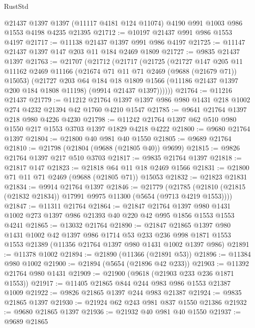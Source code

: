 \begin{lexlean}{RustStd}
\begin{coremodule}
    @21437
    @1397
    @1397
    (@11117 @4181 @124 @11074)
    @4190
    @991
    @1003
    @986
    @1553
    @4198
    @4235
    @21395
@21712 := @10197 @21437 @991 @986 @1553 @4197
@21717 := @11138 @21437 @1397 @991 @986 @4197
@21725 := @11147 @21437 @1397 @147 @203 @11 @184 @2469 @1809
@21727 := @9835 @21437 @1397
@21763 := @21707
    (@21712
      (@21717
        (@21725
          (@21727
            @147
            @205
            @11
            @11162
            @2469
            @11166
            (@21674 @71 @11 @71 @2469 (@9688 (@21679 @71)) @15053)
            (@21727
              @203
              @64
              @184
              @18
              @1809
              @1566
              (@11186 @21437 @1397 @200 @184 @1808 @11198)
              (@9914 @21437 @1397))))))
@21764 := @11216 @21437
@21779 := @11212
    @21764
    @1397
    @1397
    @986
    @980
    @1431
    @218
    @1002
    @274
    @4232
    @21394
    @42
    @1760
    @4210
    @1547
@21785 := @9641 @21764 @1397 @218 @980 @4226 @4230
@21798 := @11242 @21764 @1397 @62 @510 @980 @1550 @217 @1553 @3703 @1397 @1829 @4218 @4222
@21800 := @9680 @21764 @1397
@21804 := @21800 @40 @981 @40 @1550
@21805 := @9689 @21764
@21810 := @21798 (@21804 (@9688 (@21805 @40)) @9699)
@21815 := @9826 @21764 @1397 @217 @510 @3703
@21817 := @9835 @21764 @1397
@21818 := @21817 @147
@21823 := @21818 @64 @11 @18 @2469 @1566
@21831 := @21800 @71 @11 @71 @2469 (@9688 (@21805 @71)) @15053
@21832 := @21823 @21831
@21834 := @9914 @21764 @1397
@21846 := @21779
    (@21785 (@21810 (@21815 (@21832 @21834)) @17991 @9975 @11300 (@5654 (@9713 @4219 @1553))))
@21847 := @11311 @21764
@21864 := @21847
    @21764
    @1397
    @980
    @1431
    @1002
    @273
    @1397
    @986
    @21393
    @40
    @220
    @42
    @995
    @1856
    @1553
    @1553
    @4241
@21865 := @13032 @21764
@21890 := @21847
    @21865
    @1397
    @980
    @1431
    @1002
    @42
    @1397
    @986
    @1714
    @53
    @233
    @236
    @998
    @1871
    @1553
    @1553
    @21389
    (@11356 @21764 @1397 @980 @1431 @1002 @1397 @986)
@21891 := @11378 @1002
@21894 := @21890 (@11366 (@21891 @53))
@21896 := @11384 @980 @1002
@21900 := @21894 (@5654 (@21896 @42 @233))
@21903 := @11392 @21764 @980 @1431
@21909 := @21900 (@9618 (@21903 @233 @236 @1871 @1553))
@21917 := @11405 @21865 @844 @244 @983 @986 @1553 @21387 @1009
@21922 := @9826 @21865 @1397 @244 @983 @21387
@21924 := @9835 @21865 @1397
@21930 := @21924 @62 @243 @981 @837 @1550 @21386
@21932 := @9680 @21865 @1397
@21936 := @21932 @40 @981 @40 @1550
@21937 := @9689 @21865

\end{coremodule}
\end{lexlean}

